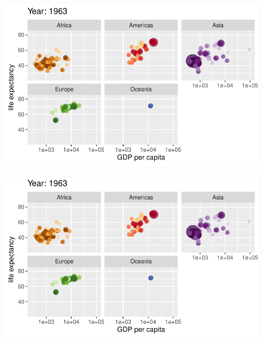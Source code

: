 \documentclass[
  letterpaper,
  DIV=11,
  numbers=noendperiod]{scrartcl}
\begin{document}
\begin{figure}[H]

{\centering \includegraphics{class05_files/figure-pdf/unnamed-chunk-24-20.pdf}

}

\end{figure}

\begin{figure}[H]

{\centering \includegraphics{class05_files/figure-pdf/unnamed-chunk-24-21.pdf}

}

\end{figure}
\end{document}
